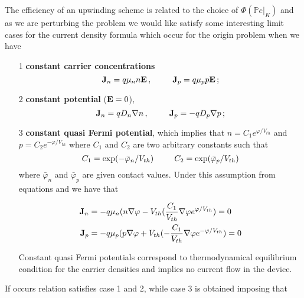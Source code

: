 %
The efficiency of an upwinding scheme is related to the choice of $\Phi(\mathbb{P}e|_K)$ and as we are perturbing the problem we would like satisfy some interesting limit cases for the current density formula which occur for the origin problem when we have 
\begin{itemize}
\item[1] \textbf{constant carrier concentrations}
\begin{equation*}
\vect{J}_n  = q\mu_n n \vect{E}\, , \psp{15} \vect{J}_p  = q\mu_p p \vect{E} \, ;
\end{equation*}
\item[2] \textbf{constant potential} ($\mathbf{E}=0$),
\begin{equation*}
\vect{J}_n  = qD_n\nabla n \, , \psp{15} \vect{J}_p  = -qD_p\nabla p \, ;
\end{equation*}
\item[3] \textbf{constant quasi Fermi potential}, which implies that $n=C_1e^{\varphi / V_{th}}$ and $p=C_2e^{-\varphi / V_{th}}$ where $C_1$ and $C_2$ are two arbitrary constants such that
\begin{equation*}
C_1 = \exp(-\bar\varphi_n/V_{th}) \psp{15} C_2 = \exp(\bar\varphi_p/V_{th})
\end{equation*}
where $\bar\varphi_n$ and $\bar\varphi_p$ are given contact values. Under this assumption from equations  and  we have that

\begin{align*}
\mathbf{J}_n & = -q\mu_n (n\nabla 	\varphi - V_{th} (\dfrac{C_1}{V_{th}}\nabla \varphi e^{\varphi / V_{th}}) = 0\\
\mathbf{J}_p & = -q\mu_p (p\nabla 	\varphi + V_{th} (-\dfrac{C_1}{V_{th}}\nabla \varphi e^{-\varphi / V_{th}}) = 0
\end{align*}
 
Constant quasi Fermi potentials correspond to thermodynamical equilibrium condition for the carrier densities and implies no current flow in the device.
\end{itemize}

If  occurs relation  satisfies case 1 and 2, while case 3 is obtained imposing that

